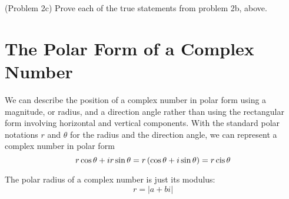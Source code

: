 \documentclass[handout]{ximera}
\begin{document}
\begin{problem}(Problem 2c)
Prove each of the true statements from problem 2b, above.
\end{problem}


\section{The Polar Form of a Complex Number}
We can describe the position of a complex number in polar form using a magnitude, or radius, 
and a direction angle rather than using the rectangular form involving horizontal and vertical components. 
With the standard polar notations $r$ and $\theta$ for the radius and the direction angle, we can represent 
a complex number in polar form  
\[
r\cos \theta + ir\sin \theta = r\left(\cos \theta + i\sin \theta\right) = r \operatorname{cis} \theta
\]

\begin{image}
\end{image}

\begin{remark}
The polar radius of a complex number is just its modulus:
\[
r = |a+bi|
\]
\end{remark}
\end{document}
